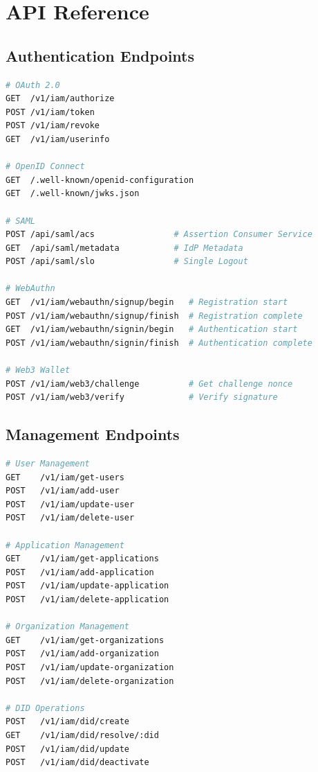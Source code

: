 \section{API Reference}


\subsection{Authentication Endpoints}

\begin{lstlisting}[language=bash]
# OAuth 2.0
GET  /v1/iam/authorize
POST /v1/iam/token
POST /v1/iam/revoke
GET  /v1/iam/userinfo

# OpenID Connect
GET  /.well-known/openid-configuration
GET  /.well-known/jwks.json

# SAML
POST /api/saml/acs                # Assertion Consumer Service
GET  /api/saml/metadata           # IdP Metadata
POST /api/saml/slo                # Single Logout

# WebAuthn
GET  /v1/iam/webauthn/signup/begin   # Registration start
POST /v1/iam/webauthn/signup/finish  # Registration complete
GET  /v1/iam/webauthn/signin/begin   # Authentication start
POST /v1/iam/webauthn/signin/finish  # Authentication complete

# Web3 Wallet
POST /v1/iam/web3/challenge          # Get challenge nonce
POST /v1/iam/web3/verify             # Verify signature
\end{lstlisting}

\subsection{Management Endpoints}

\begin{lstlisting}[language=bash]
# User Management
GET    /v1/iam/get-users
POST   /v1/iam/add-user
POST   /v1/iam/update-user
POST   /v1/iam/delete-user

# Application Management
GET    /v1/iam/get-applications
POST   /v1/iam/add-application
POST   /v1/iam/update-application
POST   /v1/iam/delete-application

# Organization Management
GET    /v1/iam/get-organizations
POST   /v1/iam/add-organization
POST   /v1/iam/update-organization
POST   /v1/iam/delete-organization

# DID Operations
POST   /v1/iam/did/create
GET    /v1/iam/did/resolve/:did
POST   /v1/iam/did/update
POST   /v1/iam/did/deactivate
\end{lstlisting}


